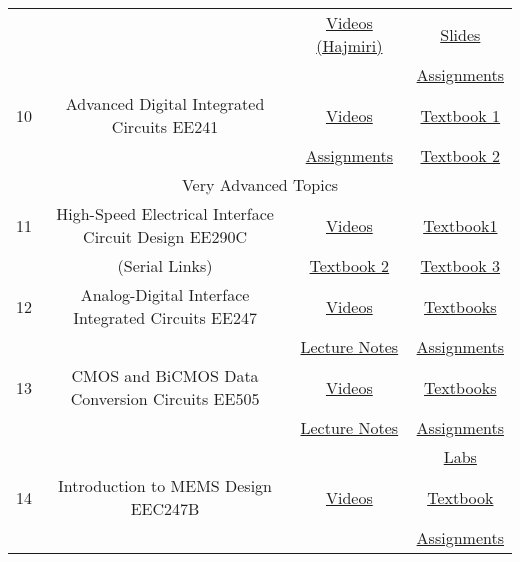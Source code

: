 \documentclass{article}
\begin{document}
\begin{table}[H]
{\begin{tabular}{|c|c|c|c|}
            & & \href{https://youtube.com/playlist?list=PLc7Gz02Znph-c2-ssFpRrzYwbzplXfXUT}{Videos (Hajmiri)}& \href{https://inst.eecs.berkeley.edu/~ee240b/sp18/lectures.html}{Slides}\\ 
            & & & \href{http://bwrcs.eecs.berkeley.edu/Classes/icdesign/ee240_s09/homework.html}{Assignments}\\ \hline
            10& Advanced Digital Integrated Circuits EE241& \href{https://archive.org/details/ucberkeley_webcast_itunesu_354820903/01.+2009-01-21+-+Lecture+1.mp4}{Videos}& \href{https://drive.google.com/file/d/1-clLoEkncZoUtc61PNqQZfctg7kJ0UlC/view}{Textbook 1}\\ 
            & & \href{https://inst.eecs.berkeley.edu//~ee241/sp20/}{Assignments}& \href{https://link.springer.com/book/10.1007/978-0-387-71713-5}{Textbook 2}\\ \hline
            \multicolumn{4}{|c|}{Very Advanced Topics}\\ \hline
            11& High-Speed Electrical Interface Circuit Design EE290C& \href{http://www.infocobuild.com/education/audio-video-courses/electronics/ee290c-spring2011-berkeley.html}{Videos}& \href{http://library.lol/main/E6402773287FE47D66C6C11F1736198B}{Textbook1}\\ 
            & (Serial Links)& \href{http://library.lol/main/0BF5887F3066FC626CE22B38E8AC0D9E}{Textbook 2}& \href{http://library.lol/main/85AA00730E0781CA50E63BF78E2E86D5}{Textbook 3}\\ \hline
            12& Analog-Digital Interface Integrated Circuits EE247& \href{https://archive.org/details/ucberkeley_webcast_itunesu_354821202}{Videos}& \href{https://inst.eecs.berkeley.edu/~ee247/fa10/references.html}{Textbooks}\\ 
            & & \href{https://inst.eecs.berkeley.edu/~ee247/fa10/lectures.html}{Lecture Notes}& \href{https://inst.eecs.berkeley.edu/~ee247/fa10/homework.html}{Assignments}\\ \hline
            13& CMOS and BiCMOS Data Conversion Circuits EE505 & \href{https://class.ece.iastate.edu/rlgeiger/Randy505/}{Videos}& \href{https://class.ece.iastate.edu/rlgeiger/Randy505/\#Reference\%20material}{Textbooks}\\ 
            & & \href{https://class.ece.iastate.edu/rlgeiger/Randy505/\#Lecture\%20notes}{Lecture Notes}& \href{https://class.ece.iastate.edu/rlgeiger/Randy505/\#Homework\%20Assignments}{Assignments}\\
            & & & \href{https://class.ece.iastate.edu/rlgeiger/Randy505/\#Lab\%20Handouts}{Labs}\\ \hline
            14& Introduction to MEMS Design EEC247B& \href{https://inst.eecs.berkeley.edu/~ee247b/sp19/lectures.html}{Videos}& \href{https://link.springer.com/book/10.1007/b117574}{Textbook}\\
            & & & \href{https://inst.eecs.berkeley.edu/~ee247b/sp19/homework.html}{Assignments}\\ \hline
        \end{tabular}
        }
\end{table}
\end{document}
